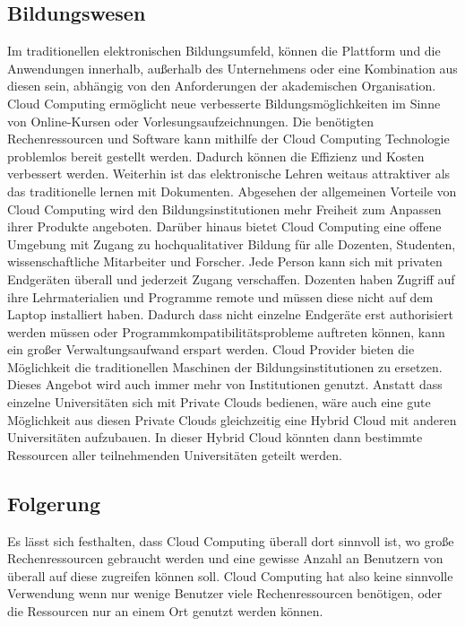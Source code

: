 \subsection{Bildungswesen}
Im traditionellen elektronischen Bildungsumfeld, können die Plattform und die Anwendungen innerhalb, außerhalb des Unternehmens oder eine Kombination aus diesen sein, abhängig von den Anforderungen der akademischen Organisation\cite{teaching}. Cloud Computing ermöglicht neue verbesserte Bildungsmöglichkeiten im Sinne von Online-Kursen oder Vorlesungsaufzeichnungen. Die benötigten Rechenressourcen und Software kann mithilfe der Cloud Computing Technologie problemlos bereit gestellt werden. Dadurch können die Effizienz und Kosten verbessert werden. Weiterhin ist das elektronische Lehren weitaus attraktiver als das traditionelle lernen mit Dokumenten\cite{teaching}.
Abgesehen der allgemeinen Vorteile von Cloud Computing wird den Bildungsinstitutionen mehr Freiheit zum Anpassen ihrer Produkte angeboten. Darüber hinaus bietet Cloud Computing eine offene Umgebung mit Zugang zu hochqualitativer Bildung für alle Dozenten, Studenten, wissenschaftliche Mitarbeiter und Forscher. Jede Person kann sich mit privaten Endgeräten überall und jederzeit Zugang verschaffen. Dozenten haben Zugriff auf ihre Lehrmaterialien und Programme remote und müssen diese nicht auf dem Laptop installiert haben. Dadurch dass nicht einzelne Endgeräte erst authorisiert werden müssen oder Programmkompatibilitätsprobleme auftreten können, kann ein großer Verwaltungsaufwand erspart werden. Cloud Provider bieten die Möglichkeit die traditionellen Maschinen der Bildungsinstitutionen zu ersetzen. Dieses Angebot wird auch immer mehr von Institutionen genutzt. Anstatt dass einzelne Universitäten sich mit Private Clouds bedienen, wäre auch eine gute Möglichkeit aus diesen Private Clouds gleichzeitig eine Hybrid Cloud mit anderen Universitäten aufzubauen. In dieser Hybrid Cloud könnten dann bestimmte Ressourcen aller teilnehmenden Universitäten geteilt werden\cite{recenttrends}.

\subsection{Folgerung}
Es lässt sich festhalten, dass Cloud Computing überall dort sinnvoll ist, wo große Rechenressourcen gebraucht werden und eine gewisse Anzahl an Benutzern von überall auf diese zugreifen können soll. Cloud Computing hat also keine sinnvolle Verwendung wenn nur wenige Benutzer viele Rechenressourcen benötigen, oder die Ressourcen nur an einem Ort genutzt werden  können.